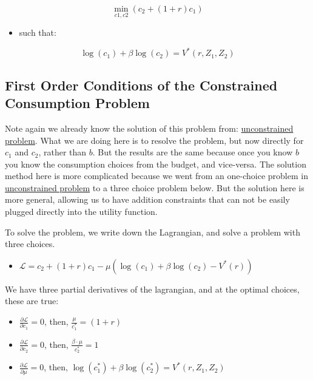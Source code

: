 \documentclass[
]{book}
\providecommand{\tightlist}{%
  \setlength{\itemsep}{0pt}\setlength{\parskip}{0pt}}
\begin{document}
\[\min_{c1,c2} \left(c_2 +(1+r)c_1 \right)\]

\begin{itemize}
\tightlist
\item
  such that:
\end{itemize}

\[\log (c_1 )+\beta \log (c_2 )=V^{\ast } (r,Z_1 ,Z_2 )\]

\hypertarget{first-order-conditions-of-the-constrained-consumption-problem-1}{%
\subsection{First Order Conditions of the Constrained Consumption Problem}\label{first-order-conditions-of-the-constrained-consumption-problem-1}}

Note again we already know the solution of this problem from:
\href{https://math4econ.github.io/derivative_application/K_save_households.html}{unconstrained
problem}.
What we are doing here is to resolve the problem, but now directly for
\(c_1\) and \(c_2\), rather than \(b\). But the results are the same because
once you know \(b\) you know the consumption choices from the budget, and
vice-versa. The solution method here is more complicated because we went
from an one-choice problem in \href{https://math4econ.github.io/derivative_application/K_save_households.html}{unconstrained
problem}
to a three choice problem below. But the solution here is more general,
allowing us to have addition constraints that can not be easily plugged
directly into the utility function.

To solve the problem, we write down the Lagrangian, and solve a problem
with three choices.

\begin{itemize}
\tightlist
\item
  \(\displaystyle \mathcal{L}=c_2 +(1+r)c_1 -\mu \left(\log (c_1 )+\beta \log (c_2 )-V^* (r)\right)\)
\end{itemize}

We have three partial derivatives of the lagrangian, and at the optimal
choices, these are true:

\begin{itemize}
\item
  \(\frac{\partial \mathcal{L}}{\partial c_1 }=0\), then,
  \(\frac{\mu }{c_1^{\ast } }=(1+r)\)
\item
  \(\frac{\partial \mathcal{L}}{\partial c_2 }=0\), then,
  \(\frac{\beta \cdot \mu }{c_2^{\ast } }=1\)
\item
  \(\frac{\partial \mathcal{L}}{\partial \mu }=0\), then,
  \(\log (c_1^{\ast } )+\beta \log (c_2^{\ast } )=V^{\ast } (r,Z_1 ,Z_2 )\)
\end{itemize}
\end{document}
